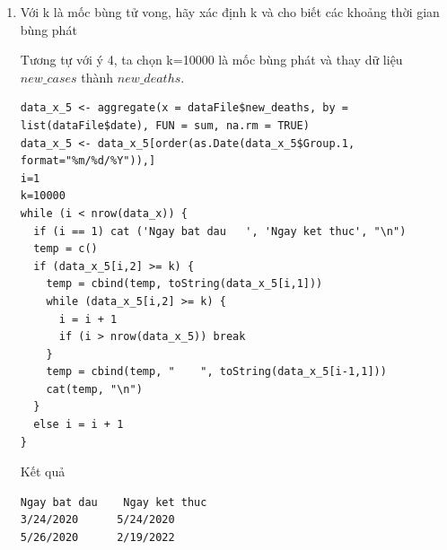 \documentclass[a4paper]{article}
\theoremstyle{definition}
\begin{document}
\begin{enumerate}[1)]
    \begin{lstlisting}
data_x_4 <- aggregate(x = dataFile$new_cases, by = list(dataFile$date), FUN = sum, na.rm = TRUE)
data_x_4 <- data_x_4[order(as.Date(data_x_4$Group.1, format="%m/%d/%Y")),]
i=1
k=10000
while (i < nrow(data_x)) {
  if (i == 1) cat ('Ngay bat dau   ', 'Ngay ket thuc', "\n")
  temp = c()
  if (data_x_4[i,2] >= k) {
    temp = cbind(temp, toString(data_x_4[i,1]))
    while (data_x_4[i,2] >= k) {
      i = i + 1
      if (i > nrow(data_x_4)) break
    }
    temp = cbind(temp, "    ", toString(data_x_4[i-1,1]))
    cat(temp, "\n")
  }
  else i = i + 1
}
    \end{lstlisting}
    Kết quả:
    \begin{lstlisting}
Ngay bat dau    Ngay ket thuc 
1/28/2020      1/28/2020 
2/2/2020      2/10/2020 
2/13/2020      2/14/2020 
3/1/2020      3/1/2020 
3/3/2020      2/19/2022
    \end{lstlisting}
    
Nhận xét: với cách chọn mốc bùng dịch này, ta có thể thấy rằng dịch đã bùng lên ở một khoảng rất lâu, từ đầu năm 2020 đến đầu năm 2022.
        \item Với k là mốc bùng tử vong, hãy xác định k và cho biết các khoảng thời gian bùng phát
        
    Tương tự với ý 4, ta chọn k=10000 là mốc bùng phát và thay dữ liệu $new\_cases$ thành $new\_deaths$.
    \begin{lstlisting}
data_x_5 <- aggregate(x = dataFile$new_deaths, by = list(dataFile$date), FUN = sum, na.rm = TRUE)
data_x_5 <- data_x_5[order(as.Date(data_x_5$Group.1, format="%m/%d/%Y")),]
i=1
k=10000
while (i < nrow(data_x)) {
  if (i == 1) cat ('Ngay bat dau   ', 'Ngay ket thuc', "\n")
  temp = c()
  if (data_x_5[i,2] >= k) {
    temp = cbind(temp, toString(data_x_5[i,1]))
    while (data_x_5[i,2] >= k) {
      i = i + 1
      if (i > nrow(data_x_5)) break
    }
    temp = cbind(temp, "    ", toString(data_x_5[i-1,1]))
    cat(temp, "\n")
  }
  else i = i + 1
}
    \end{lstlisting}
    Kết quả
    \begin{lstlisting}
Ngay bat dau    Ngay ket thuc 
3/24/2020      5/24/2020 
5/26/2020      2/19/2022 
    \end{lstlisting}
    

\end{enumerate}
\end{document}
